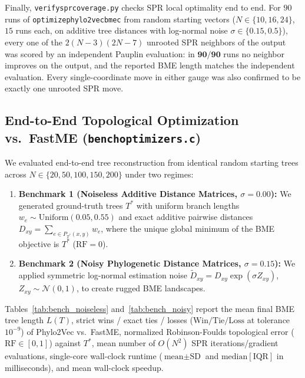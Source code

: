 \documentclass[11pt,a4paper]{article}
\makeatletter
\DeclareRobustCommand{\_}{\ifmmode\nfss@text{\textunderscore}\else\textunderscore\allowbreak\fi}
\theoremstyle{definition}
\makeatother
\begin{document}
Finally, \texttt{verify\_spr\_coverage.py} checks SPR local optimality end to end. For $90$ runs of \texttt{optimize\_phylo2vec\_bme\_c} from random starting vectors ($N \in \{10, 16, 24\}$, $15$ runs each, on additive tree distances with log-normal noise $\sigma \in \{0.15, 0.5\}$), every one of the $2(N-3)(2N-7)$ unrooted SPR neighbors of the output was scored by an independent Pauplin evaluation: in $\mathbf{90 / 90}$ runs no neighbor improves on the output, and the reported BME length matches the independent evaluation. Every single-coordinate move in either gauge was also confirmed to be exactly one unrooted SPR move.

\subsection{End-to-End Topological Optimization vs.\ FastME (\texttt{bench\_optimizers.c})}
We evaluated end-to-end tree reconstruction from identical random starting trees across $N \in \{20, 50, 100, 150, 200\}$ under two regimes:
\begin{enumerate}
    \item \textbf{Benchmark 1 (Noiseless Additive Distance Matrices, $\sigma = 0.00$):} We generated ground-truth trees $T^*$ with uniform branch lengths $w_e \sim \text{Uniform}(0.05, 0.55)$ and exact additive pairwise distances $D_{xy} = \sum_{e \in P_{T^*}(x,y)} w_e$, where the unique global minimum of the BME objective is $T^*$ ($\text{RF} = 0$).
    \item \textbf{Benchmark 2 (Noisy Phylogenetic Distance Matrices, $\sigma = 0.15$):} We applied symmetric log-normal estimation noise $\tilde{D}_{xy} = D_{xy} \exp(\sigma Z_{xy})$, $Z_{xy} \sim \mathcal{N}(0, 1)$, to create rugged BME landscapes.
\end{enumerate}

Tables~\ref{tab:bench_noiseless} and~\ref{tab:bench_noisy} report the mean final BME tree length $L(T)$, strict wins / exact ties / losses ($\text{Win/Tie/Loss}$ at tolerance $10^{-9}$) of Phylo2Vec vs.\ FastME, normalized Robinson-Foulds topological error ($\text{RF} \in [0, 1]$) against $T^*$, mean number of $O(N^2)$ SPR iterations/gradient evaluations, single-core wall-clock runtime ($\text{mean} \pm \text{SD}$ and $\text{median}[\text{IQR}]$ in milliseconds), and mean wall-clock speedup.
\end{document}
